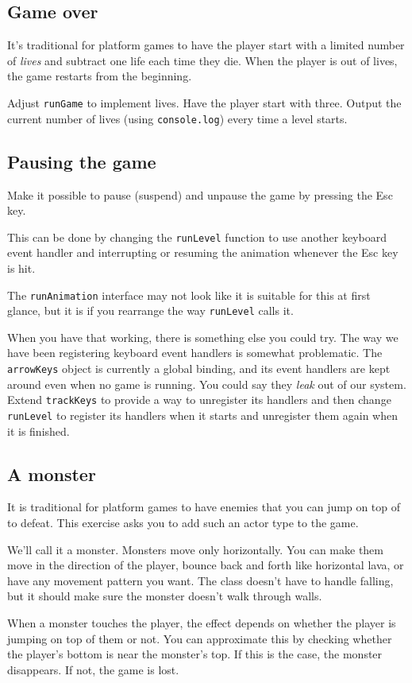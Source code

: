 \subsection{Game over}

It's traditional for platform games to have the player start with a limited number of \emph{lives} and subtract one life each time they die. When the player is out of lives, the game restarts from the beginning.

Adjust \lstinline`runGame` to implement lives. Have the player start with three. Output the current number of lives (using \lstinline`console.log`) every time a level starts.

\subsection{Pausing the game}

Make it possible to pause (suspend) and unpause the game by pressing the Esc key.

This can be done by changing the \lstinline`runLevel` function to use another keyboard event handler and interrupting or resuming the animation whenever the Esc key is hit.

The \lstinline`runAnimation` interface may not look like it is suitable for this at first glance, but it is if you rearrange the way \lstinline`runLevel` calls it.

When you have that working, there is something else you could try. The way we have been registering keyboard event handlers is somewhat problematic. The \lstinline`arrowKeys` object is currently a global binding, and its event handlers are kept around even when no game is running. You could say they \emph{leak} out of our system. Extend \lstinline`trackKeys` to provide a way to unregister its handlers and then change \lstinline`runLevel` to register its handlers when it starts and unregister them again when it is finished.

\subsection{A monster}

It is traditional for platform games to have enemies that you can jump on top of to defeat. This exercise asks you to add such an actor type to the game.

We'll call it a monster. Monsters move only horizontally. You can make them move in the direction of the player, bounce back and forth like horizontal lava, or have any movement pattern you want. The class doesn't have to handle falling, but it should make sure the monster doesn't walk through walls.

When a monster touches the player, the effect depends on whether the player is jumping on top of them or not. You can approximate this by checking whether the player's bottom is near the monster's top. If this is the case, the monster disappears. If not, the game is lost.
